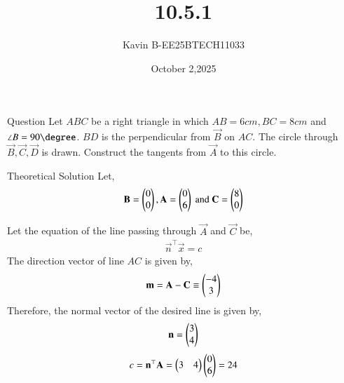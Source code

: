 \documentclass{beamer}
\begin{document}
\title 
{10.5.1}
\date{October 2,2025}


\author 
{Kavin B-EE25BTECH11033}






\frame{\titlepage}
\begin{frame}{Question}
Let $ABC$ be a right triangle in which $AB = 6 cm, BC = 8 cm$ and $\angle B = 90\degree$. $BD$ is the perpendicular from $\vec{B}$ on $AC$. The circle through $\vec{B}, \vec{C}, \vec{D}$ is drawn. Construct the tangents from $\vec{A}$ to this circle.\\    
\bigskip
\end{frame}



\begin{frame}{Theoretical Solution}
Let,
\begin{align}
    \mathbf{B} = \begin{pmatrix}0\\0\end{pmatrix} , \mathbf{A}=\begin{pmatrix}0\\6\end{pmatrix} \text{ and } \mathbf{C} = \begin{pmatrix}8\\0\end{pmatrix}
\end{align}

Let the equation of the line passing through $\vec{A}$ and $\vec{C}$ be,
\begin{align}
    \vec{n}^\top\vec{x}=c
\end{align}
The direction vector of line $AC$ is given by,
\begin{align}
\mathbf{m}=\mathbf{A}-\mathbf{C} \equiv \begin{pmatrix}-4\\3\end{pmatrix}
\end{align}
Therefore, the normal vector of the desired line is given by,
\begin{align}
    \mathbf{n}=\begin{pmatrix}3\\4\end{pmatrix}
\end{align}
\begin{align}
    c = \mathbf{n}^\top\mathbf{A} = \begin{pmatrix}3&4\end{pmatrix}\begin{pmatrix}0\\6\end{pmatrix} = 24
\end{align}
\end{frame}
\end{document}
